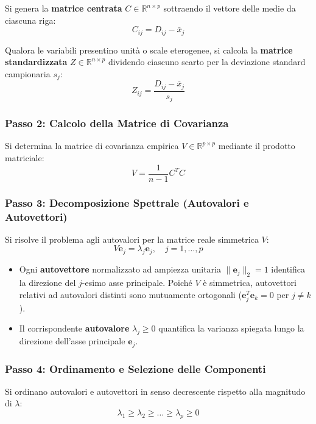 Si genera la \textbf{matrice centrata} $C \in \mathbb{R}^{n \times p}$ sottraendo il vettore delle medie da ciascuna riga:
\begin{equation}
    C_{ij} = D_{ij} - \bar{x}_j
\end{equation}

Qualora le variabili presentino unità o scale eterogenee, si calcola la \textbf{matrice standardizzata} $Z \in \mathbb{R}^{n \times p}$ dividendo ciascuno scarto per la deviazione standard campionaria $s_j$:
\begin{equation}
    Z_{ij} = \frac{D_{ij} - \bar{x}_j}{s_j}
\end{equation}

\subsubsection{Passo 2: Calcolo della Matrice di Covarianza}
Si determina la matrice di covarianza empirica $V \in \mathbb{R}^{p \times p}$ mediante il prodotto matriciale:
\begin{equation}
    V = \frac{1}{n-1} C^T C
\end{equation}

\subsubsection{Passo 3: Decomposizione Spettrale (Autovalori e Autovettori)}
Si risolve il problema agli autovalori per la matrice reale simmetrica $V$:
\begin{equation}
    V \mathbf{e}_j = \lambda_j \mathbf{e}_j, \quad j = 1, \dots, p
\end{equation}
\begin{itemize}[noitemsep]
    \item Ogni \textbf{autovettore} normalizzato ad ampiezza unitaria $\|\mathbf{e}_j\|_2 = 1$ identifica la direzione del $j$-esimo asse principale. Poiché $V$ è simmetrica, autovettori relativi ad autovalori distinti sono mutuamente ortogonali ($\mathbf{e}_j^T \mathbf{e}_k = 0$ per $j \neq k$).
    \item Il corrispondente \textbf{autovalore} $\lambda_j \ge 0$ quantifica la varianza spiegata lungo la direzione dell'asse principale $\mathbf{e}_j$.
\end{itemize}

\subsubsection{Passo 4: Ordinamento e Selezione delle Componenti}
Si ordinano autovalori e autovettori in senso decrescente rispetto alla magnitudo di $\lambda$:
\begin{equation}
    \lambda_1 \ge \lambda_2 \ge \dots \ge \lambda_p \ge 0
\end{equation}

